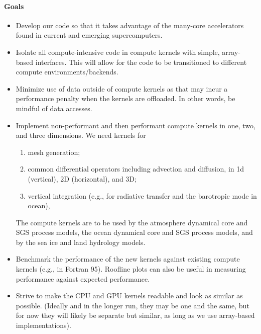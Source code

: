 \documentclass{article}
\begin{document}
\paragraph{Goals}
\begin{itemize}
    \item Develop our code so that it takes advantage of the many-core accelerators found in current and emerging supercomputers.
    \item Isolate all compute-intensive code in compute kernels with simple, array-based interfaces.  This will allow for the code to be transitioned to different compute environments/backends.
    \item Minimize use of data outside of compute kernels as that may incur a performance penalty when the kernels are offloaded.  In other words, be mindful of data accesses.
    \item Implement non-performant and then performant compute kernels in one, two, and three dimensions. We need kernels for 
    \begin{enumerate}
    	\item mesh generation;
	\item common differential operators including advection and diffusion, in 1d (vertical), 2D (horizontal), and 3D;
	\item vertical integration (e.g., for radiative transfer and the barotropic mode in ocean),
    \end{enumerate}
	The compute kernels are to be used by the atmosphere dynamical core and SGS process models, the ocean dynamical core and SGS process models, and by the sea ice and land hydrology models.
    \item Benchmark the performance of the new kernels against existing compute kernels (e.g., in Fortran 95).  Roofline plots can also be useful in measuring performance against expected performance.
    \item Strive to make the CPU and GPU kernels readable and look as similar as possible. (Ideally and in the longer run, they may be one and the same, but for now they will likely be separate but similar, as long as we use array-based implementations). 
\end{itemize}

\end{document}
